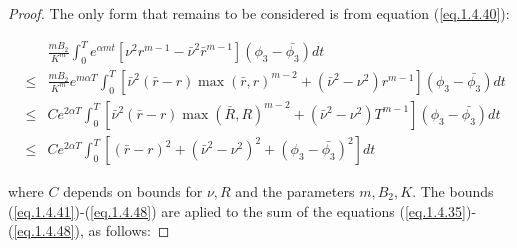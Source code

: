 \begin{proof}
The only form that remains to be considered is from equation (\ref{eq.1.4.40}):

\begin{eqnarray}
&&\frac{mB_2}{K^m}\int_{0}^{T}e^{\alpha m t}[\nu^2r^{m-1}-\bar{\nu}^2\bar{r}^{m-1}](\phi_3-\bar{\phi_3})dt\nonumber\\ &\leq& \frac{mB_2}{K^m}e^{m\alpha T}\int_{0}^{T}[\bar{\nu}^2(\bar{r}-r)\max(\bar{r},r)^{m-2}+(\bar{\nu}^2-\nu^2)r^{m-1}](\phi_3-\bar{\phi_3})dt\nonumber\\
&\leq& Ce^{2\alpha T}\int_{0}^{T}[\bar{\nu}^2(\bar{r}-r)\max(\bar{R},R)^{m-2}+(\bar{\nu}^2-\nu^2)T^{m-1}](\phi_3-\bar{\phi_3})dt\nonumber\\
&\leq& Ce^{2\alpha T}\int_{0}^{T}[(\bar{r}-r)^2+(\bar{\nu}^2-\nu^2)^2+(\phi_3-\bar{\phi_3})^2]dt \label{eq.1.4.48}
\end{eqnarray}

where $C$ depends on bounds for $\nu,R$ and the parameters $m,B_2,K$. The bounds (\ref{eq.1.4.41})-(\ref{eq.1.4.48}) are aplied to the sum of the equations (\ref{eq.1.4.35})-(\ref{eq.1.4.48}), as follows:


\end{proof}
